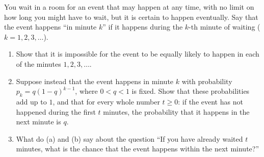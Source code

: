 You wait in a room for an event that may happen at any time, with no limit on how long you might have to wait, but it is certain to happen eventually. Say that the event happens ``in minute $k$'' if it happens during the $k$-th minute of waiting ($k=1,2,3,\dots$).
\begin{enumerate}
\item[(a)] Show that it is impossible for the event to be equally likely to happen in each of the minutes $1,2,3,\dots$.
\item[(b)] Suppose instead that the event happens in minute $k$ with probability $p_k=q(1-q)^{k-1}$, where $0<q<1$ is fixed. Show that these probabilities add up to $1$, and that for every whole number $t\ge0$: if the event has not happened during the first $t$ minutes, the probability that it happens in the next minute is $q$.
\item[(c)] What do (a) and (b) say about the question ``If you have already waited $t$ minutes, what is the chance that the event happens within the next minute?''
\end{enumerate}

